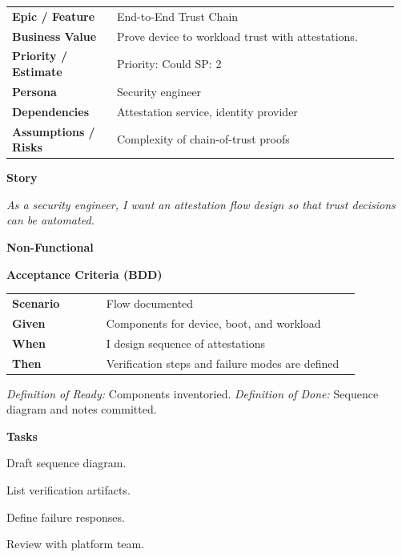 \documentclass[11pt,letterpaper]{article}
\makeatletter
\newenvironment{kvtable}{%
  \par\noindent\begin{tabular}{@{}>{\raggedright\bfseries\arraybackslash}p{0.26\linewidth} >{\raggedright\arraybackslash}p{0.70\linewidth}@{}}
}{\end{tabular}\par}
\newenvironment{bdd}{%
  \par\noindent\begin{tabular}{@{}>{\raggedright\bfseries\arraybackslash}p{0.26\linewidth} >{\raggedright\arraybackslash}p{0.70\linewidth}@{}}
}{\end{tabular}\par}
\newcommand{\DoRDoD}[2]{%
  \vspace{0.35em}
  {\footnotesize\color{Muted}%
    \textit{Definition of Ready:} #1 \; \textbullet\;
    \textit{Definition of Done:} #2%
  }%
}
\newenvironment{storycard}[2]{%
  \begin{tcolorbox}[cloudcard, title={#1 --- #2}]%
}{\end{tcolorbox}}
\newcommand{\sectionlabel}[1]{\par\vspace{0.35em}\textbf{#1}\par}
\makeatother
\begin{document}
\begin{storycard}{CCS-26}{Ch. 26 — Trusted Computing Proposals}
\begin{kvtable}
Epic / Feature & End-to-End Trust Chain\\
Business Value & Prove device to workload trust with attestations.\\
Priority / Estimate & Priority: Could \quad SP: 2\\
Persona & Security engineer\\
Dependencies & Attestation service, identity provider\\
Assumptions / Risks & Complexity of chain-of-trust proofs\\
\end{kvtable}
\sectionlabel{Story}
\textit{As a security engineer, I want an attestation flow design so that trust decisions can be automated.}
\sectionlabel{Non-Functional}\;
\sectionlabel{Acceptance Criteria (BDD)}
\begin{bdd}
Scenario & Flow documented\\
Given & Components for device, boot, and workload\\
When & I design sequence of attestations\\
Then & Verification steps and failure modes are defined\\
\end{bdd}
\DoRDoD{Components inventoried.}{Sequence diagram and notes committed.}
\sectionlabel{Tasks}
\begin{checklist}
\item Draft sequence diagram.
\item List verification artifacts.
\item Define failure responses.
\item Review with platform team.
\end{checklist}
\end{storycard}
\end{document}
